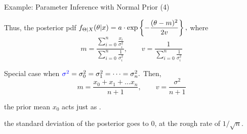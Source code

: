 \begin{frame}{Example: Parameter Inference with Normal Prior (4)}


  \plitemsep 0.03in
  \bci
  
\item<2-> Thus, the posterior pdf $\displaystyle f_{\Theta|X}(\theta|x) = a \cdot \exp \left\{ -
    \frac{(\theta - m)^2}{2 v}  \right\},$ where
  $$
  m = \frac
  {\sum_{i=0}^n \frac{x_i}{\sigma_i^2}}
  {\sum_{i=0}^n \frac{1}{\sigma_i^2}}, \qquad v =
  \frac{1}{\sum_{i=0}^n \frac{1}{\sigma_i^2}}
  $$
 
\item<3-> 

\item<4-> Special case when ${\color{blue} \sigma^2} = \sigma_0^2= \sigma_1^2=
  \cdots = \sigma_n^2.$ Then,  
  $$
  m = \frac{x_0 + x_1 + \ldots x_n}{n+1}, \qquad v = \frac{\sigma^2}{n+1}
  $$
  \bci
\item<5-> the prior mean $x_0$ acts just as .
\item<6-> the standard deviation of the posterior goes to 0, at the
  rough rate of $1/\sqrt{n}.$
  \eci

  \eci

\end{frame}


